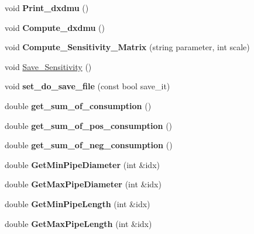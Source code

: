 \begin{DoxyCompactItemize}
void {\bfseries Print\+\_\+dxdmu} ()
\item 
\mbox{\label{class_staci_abf31b6f78c548e42970b98941d35aba9}} 
void {\bfseries Compute\+\_\+dxdmu} ()
\item 
\mbox{\label{class_staci_afc29a7cbf16da192dfdece5f689546e5}} 
void {\bfseries Compute\+\_\+\+Sensitivity\+\_\+\+Matrix} (string parameter, int scale)
\item 
void \hyperlink{class_staci_adfa2f37ff32dedbb4f71df48951ed786}{Save\+\_\+\+Sensitivity} ()
\item 
\mbox{\label{class_staci_a981510ebb2cb58d898fb258063d6f890}} 
void {\bfseries set\+\_\+do\+\_\+save\+\_\+file} (const bool save\+\_\+it)
\item 
\mbox{\label{class_staci_a920547ca1fbf6da0fe4b80db05a5e027}} 
double {\bfseries get\+\_\+sum\+\_\+of\+\_\+consumption} ()
\item 
\mbox{\label{class_staci_a382120835654d66e09b2975b22809b76}} 
double {\bfseries get\+\_\+sum\+\_\+of\+\_\+pos\+\_\+consumption} ()
\item 
\mbox{\label{class_staci_a00fff9cdb062d4101604e5cb0ffa673c}} 
double {\bfseries get\+\_\+sum\+\_\+of\+\_\+neg\+\_\+consumption} ()
\item 
\mbox{\label{class_staci_a93e861cc624e16e4fe897c4cc88ac729}} 
double {\bfseries Get\+Min\+Pipe\+Diameter} (int \&idx)
\item 
\mbox{\label{class_staci_a8cdd05ac08ee1b6efe3fe0094d502ce1}} 
double {\bfseries Get\+Max\+Pipe\+Diameter} (int \&idx)
\item 
\mbox{\label{class_staci_ae48a8e0de1ac049d9b91d9d91aa3f853}} 
double {\bfseries Get\+Min\+Pipe\+Length} (int \&idx)
\item 
\mbox{\label{class_staci_a1ac3bd68b82e31098889d8cc7079fa23}} 
double {\bfseries Get\+Max\+Pipe\+Length} (int \&idx)
\item 
\mbox{\label{class_staci_a639a97b58a3b190b8e408525d08b1d5a}} 

\end{DoxyCompactItemize}

